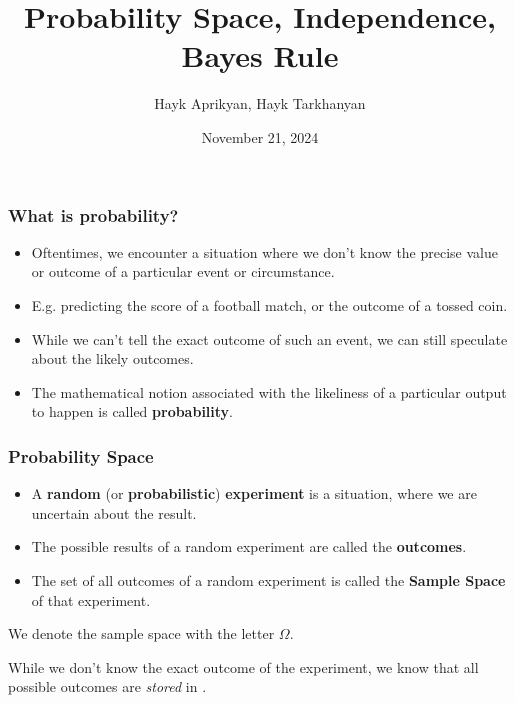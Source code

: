 \documentclass{beamer}
\title[Lecture 8]{Probability Space, Independence, Bayes Rule}
\author[Aprikyan, Tarkhanyan]{Hayk Aprikyan, Hayk Tarkhanyan}
\institute[ACA]{Armenian Code Academy}
\date{November 21, 2024}
\begin{document}
\begin{frame}
  \titlepage
\end{frame}


\begin{frame}
\frametitle{What is probability?}


\begin{itemize}[<+->]
    \item Oftentimes, we encounter a situation where we don't know the precise value or outcome of a particular event or circumstance.
    
    \item E.g. predicting the score of a football match, or the outcome of a tossed coin.
    
    \item While we can't tell the exact outcome of such an event, we can still speculate about the likely outcomes.
    
    \item The mathematical notion associated with the likeliness of a particular output to happen is called \textbf{probability}.
\end{itemize}
\end{frame}



\begin{frame}
\frametitle{Probability Space}

\begin{itemize}[<+->]
    \item A \textbf{random} (or \textbf{probabilistic}) \textbf{experiment} is a situation, where we are uncertain about the result.

    \item The possible results of a random experiment are called the \textbf{outcomes}.
    
    \item The set of all outcomes of a random experiment is called the \textbf{Sample Space} of that experiment.

\end{itemize} 

\pause[\thebeamerpauses]

We denote the sample space with the letter $\Omega$.

While we don't know the exact outcome of the experiment, we know that all possible outcomes are \textit{stored} in \Omega.

\end{frame}
\end{document}
